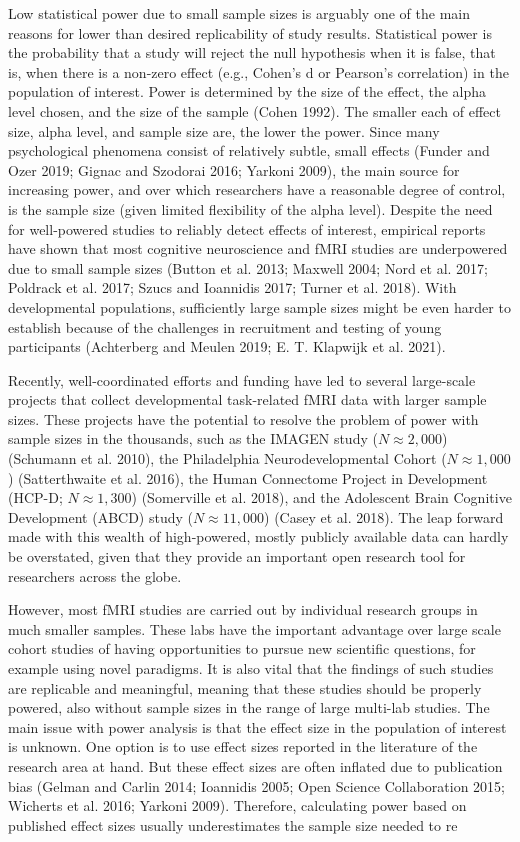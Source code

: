 \documentclass[
  letterpaper,
  DIV=11,
  numbers=noendperiod]{scrartcl}
\begin{document}
Low statistical power due to small sample sizes is arguably one of the
main reasons for lower than desired replicability of study results.
Statistical power is the probability that a study will reject the null
hypothesis when it is false, that is, when there is a non-zero effect
(e.g., Cohen's d or Pearson's correlation) in the population of
interest. Power is determined by the size of the effect, the alpha level
chosen, and the size of the sample (Cohen 1992). The smaller each of
effect size, alpha level, and sample size are, the lower the power.
Since many psychological phenomena consist of relatively subtle, small
effects (Funder and Ozer 2019; Gignac and Szodorai 2016; Yarkoni 2009),
the main source for increasing power, and over which researchers have a
reasonable degree of control, is the sample size (given limited
flexibility of the alpha level). Despite the need for well-powered
studies to reliably detect effects of interest, empirical reports have
shown that most cognitive neuroscience and fMRI studies are underpowered
due to small sample sizes (Button et al. 2013; Maxwell 2004; Nord et al.
2017; Poldrack et al. 2017; Szucs and Ioannidis 2017; Turner et al.
2018). With developmental populations, sufficiently large sample sizes
might be even harder to establish because of the challenges in
recruitment and testing of young participants (Achterberg and Meulen
2019; E. T. Klapwijk et al. 2021).

Recently, well-coordinated efforts and funding have led to several
large-scale projects that collect developmental task-related fMRI data
with larger sample sizes. These projects have the potential to resolve
the problem of power with sample sizes in the thousands, such as the
IMAGEN study (\(N ≈ 2,000\)) (Schumann et al. 2010), the Philadelphia
Neurodevelopmental Cohort (\(N ≈ 1,000\)) (Satterthwaite et al. 2016),
the Human Connectome Project in Development (HCP-D; \(N ≈ 1,300\))
(Somerville et al. 2018), and the Adolescent Brain Cognitive Development
(ABCD) study (\(N ≈ 11,000\)) (Casey et al. 2018). The leap forward made
with this wealth of high-powered, mostly publicly available data can
hardly be overstated, given that they provide an important open research
tool for researchers across the globe.

However, most fMRI studies are carried out by individual research groups
in much smaller samples. These labs have the important advantage over
large scale cohort studies of having opportunities to pursue new
scientific questions, for example using novel paradigms. It is also
vital that the findings of such studies are replicable and meaningful,
meaning that these studies should be properly powered, also without
sample sizes in the range of large multi-lab studies. The main issue
with power analysis is that the effect size in the population of
interest is unknown. One option is to use effect sizes reported in the
literature of the research area at hand. But these effect sizes are
often inflated due to publication bias (Gelman and Carlin 2014;
Ioannidis 2005; Open Science Collaboration 2015; Wicherts et al. 2016;
Yarkoni 2009). Therefore, calculating power based on published effect
sizes usually underestimates the sample size needed to re
\end{document}
